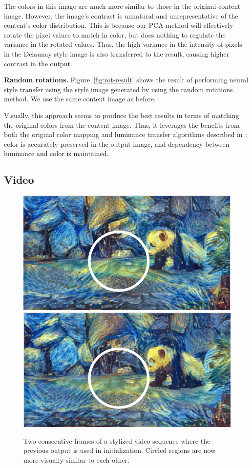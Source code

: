 \documentclass[10pt,twocolumn,letterpaper]{article}
\begin{document}
The colors in this image are much more similar to those in the original content image. However, the image's contrast is unnatural and unrepresentative of the content's color distribution. This is because our PCA method will effectively rotate the pixel values to match in color, but does nothing to regulate the variance in the rotated values. Thus, the high variance in the intensity of pixels in the Delaunay style image is also transferred to the result, causing higher contrast in the output.

\bigbreak\noindent\textbf{Random rotations.}
Figure~\ref{fig:rot-result} shows the result of performing neural style transfer using the style image generated by using the random rotations method. We use the same content image as before.

Visually, this approach seems to produce the best results in terms of matching the original colors from the content image. Thus, it leverages the benefits from both the original color mapping and luminance transfer algorithms described in~\cite{gatys-color}: color is accurately preserved in the output image, and dependency between luminance and color is maintained.

\subsection{Video}
\begin{figure}[ht]
\centering
\includegraphics[width=0.48\linewidth]{imgs/pandap1.png}
\quad
\includegraphics[width=0.48\linewidth]{imgs/pandap2.png}
\caption{Two consecutive frames of a stylized video sequence where the previous output is used in initialization. Circled regions are now more visually similar to each other.}
\label{fig:video-final}
\end{figure}
\end{document}
